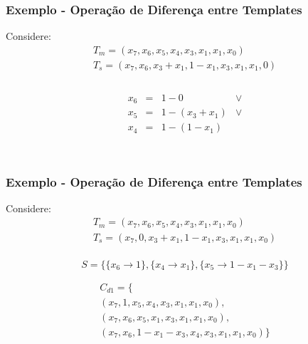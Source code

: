 \documentclass[aspectratio=43,hyperref={pdfpagelabels=false}]{beamer}
\begin{document}
 \begin{frame}
    \frametitle{Exemplo - Operação de Diferença entre Templates}
    Considere:
    \begin{equation*}
    \begin{split}
    T_m = (x_7, x_6, x_5, x_4, x_3, x_1, x_1, x_0) \\
    T_s = (x_7, x_6, x_3 + x_1, 1 - x_1, x_3, x_1, x_1, 0)\\
    \end{split}
    \end{equation*}

    \begin{equation}
      \begin{matrix}
        &  &                     &   \\
       x_6 & = & 1 - 0           & \vee  \\
       x_5 & = & 1 - (x_3 + x_1) & \vee  \\
       x_4 & = & 1 - (1 - x_1)   &   \\
        &  &                     &   \\
        &  &                     &   \\
        &  &                     &   \\
        &  &                     &   \\
      \end{matrix}
    \end{equation}

\end{frame}


\begin{frame}
    \frametitle{Exemplo - Operação de Diferença entre Templates}
    Considere:
    \begin{equation*}
    \begin{split}
    T_m = (x_7, x_6, x_5, x_4, x_3, x_1, x_1, x_0) \\
    T_s = (x_7, 0, x_3 + x_1, 1 - x_1, x_3, x_1, x_1, x_0)\\
    \end{split}
    \end{equation*}

    \begin{equation}
    S = \{\{x_6 \to 1\}, \{x_4 \to x_1\}, \{x_5 \to 1 - x_1 - x_3\}\}
    \label{eq:logicalComplement3}
    \end{equation}

    \begin{equation}
    \begin{split}
    C_{d1} = \{\\(x_7, 1, x_5, x_4, x_3, x_1, x_1, x_0), \\(x_7, x_6, x_5, x_1, x_3, x_1, x_1, x_0), \\(x_7, x_6, 1 - x_1 - x_3, x_4, x_3, x_1, x_1, x_0)\}
    \end{split}
    \label{eq:logicalComplement3}
    \end{equation}

\end{frame}
\end{document}
